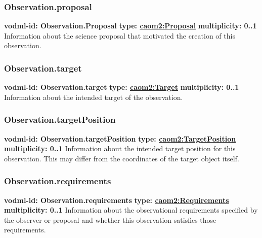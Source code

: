     \subsubsection{Observation.proposal}
      \textbf{vodml-id: Observation.Proposal} \newline
      \textbf{type: \hyperref[sect:Proposal]{caom2:Proposal}} \newline
      \textbf{multiplicity: 0..1} \newline
      Information about the science proposal that motivated the creation of this observation.

    \subsubsection{Observation.target}
      \textbf{vodml-id: Observation.target} \newline
      \textbf{type: \hyperref[sect:Target]{caom2:Target}} \newline
      \textbf{multiplicity: 0..1} \newline
      Information about the intended target of the observation.

    \subsubsection{Observation.targetPosition}
      \textbf{vodml-id: Observation.targetPosition} \newline
      \textbf{type: \hyperref[sect:TargetPosition]{caom2:TargetPosition}} \newline
      \textbf{multiplicity: 0..1} \newline
      Information about the intended target position for this observation. This may differ from the coordinates of the target object itself.

    \subsubsection{Observation.requirements}
      \textbf{vodml-id: Observation.requirements} \newline
      \textbf{type: \hyperref[sect:Requirements]{caom2:Requirements}} \newline
      \textbf{multiplicity: 0..1} \newline
      Information about the observational requirements specified by the observer or proposal and whether this observation satisfies those requirements.

